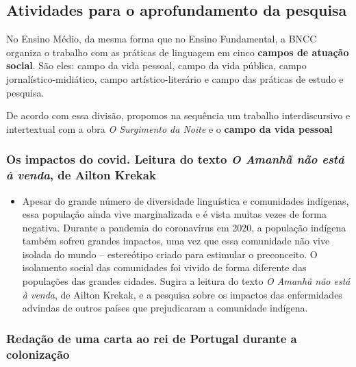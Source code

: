 \documentclass[12pt]{extarticle}
\begin{document}

\subsection{Atividades para o aprofundamento da pesquisa}

No Ensino Médio, da mesma forma que no Ensino Fundamental, a BNCC
organiza o trabalho com as práticas de linguagem em cinco \textbf{campos
de atuação social}. São eles: campo da vida pessoal, campo da vida
pública, campo jornalístico-midiático, campo artístico-literário e campo
das práticas de estudo e pesquisa.

De acordo com essa divisão, propomos na sequência um trabalho
interdiscursivo e intertextual com a obra \emph{O Surgimento da Noite} e o \textbf{campo da vida pessoal}

\subsubsection{Os impactos do covid. Leitura do texto \emph{O Amanhã não está à venda}, de Ailton Krekak}

\begin{itemize}
\item
  Apesar do grande número de diversidade linguística e comunidades
  indígenas, essa população ainda vive marginalizada e é vista muitas
  vezes de forma negativa. Durante a pandemia do coronavírus em 2020, a
  população indígena também sofreu grandes impactos, uma vez que essa
  comunidade não vive isolada do mundo -- estereótipo criado para
  estimular o preconceito. O isolamento social das comunidades foi
  vivido de forma diferente das populações das grandes cidades. Sugira a
  leitura do texto \emph{O Amanhã não está à venda}, de Ailton Krekak, e a
  pesquisa sobre os impactos das enfermidades advindas de outros países
  que prejudicaram a comunidade indígena.
\end{itemize}


\subsubsection{Redação de uma carta ao rei de Portugal durante a colonização}
\end{document}
